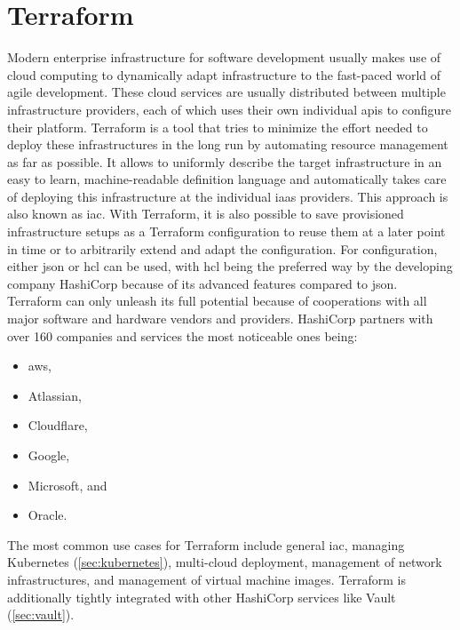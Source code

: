 \section{Terraform}
Modern enterprise infrastructure for software development usually makes use of cloud computing to dynamically adapt infrastructure to the fast-paced world of agile development.
These cloud services are usually distributed between multiple infrastructure providers, each of which uses their own individual \acp{api} to configure their platform.
Terraform is a tool that tries to minimize the effort needed to deploy these infrastructures in the long run by automating resource management as far as possible.
It allows to uniformly describe the target infrastructure in an easy to learn, machine-readable definition language and automatically takes care of deploying this infrastructure at the individual \ac{iaas} providers.
This approach is also known as \ac{iac}.
With Terraform, it is also possible to save provisioned infrastructure setups as a Terraform configuration to reuse them at a later point in time or to arbitrarily extend and adapt the configuration.
For configuration, either \ac{json} or \ac{hcl} can be used, with \ac{hcl} being the preferred way by the developing company HashiCorp because of its advanced features compared to \ac{json}.
Terraform can only unleash its full potential because of cooperations with all major software and hardware vendors and providers.
HashiCorp partners with over 160 companies and services the most noticeable ones being:
\begin{itemize}
    \item \ac{aws},
    \item Atlassian,
    \item Cloudflare,
    \item Google,
    \item Microsoft, and
    \item Oracle.
\end{itemize}

The most common use cases for Terraform include general \ac{iac}, managing Kubernetes (\autoref{sec:kubernetes}), multi-cloud deployment, management of network infrastructures, and management of virtual machine images.
Terraform is additionally tightly integrated with other HashiCorp services like Vault (\autoref{sec:vault}).

    
